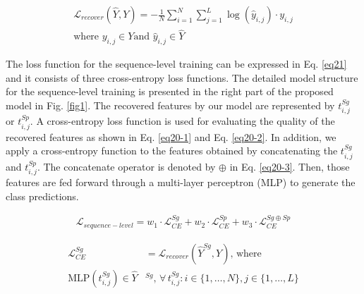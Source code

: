 \vspace{-1pt}
\begin{align}
\label{eq17}
\mathcal{L}_{recover}(\hat{Y}, Y) = -\frac{1}{N} \sum_{i=1}^{N} \sum_{j=1}^{L} \log(\hat{y}_{i, j}) \cdot y_{i,j} \\ \nonumber
\text{where } y_{i, j} \in Y \text{and } \hat{y}_{i, j} \in \hat{Y}
\end{align}
\vspace{-10pt}


The loss function for the sequence-level training can be expressed in Eq. \ref{eq21} and it consists of three cross-entropy loss functions. The detailed model structure for the sequence-level training is presented in the right part of the proposed model in Fig. \ref{fig1}.
%
%
The recovered features by our model are represented by $t^{Sg}_{i,j}$ or $t^{Sp}_{i,j}$.
%
A cross-entropy loss function is used for evaluating the quality of the recovered features as shown in Eq. \ref{eq20-1} and Eq. \ref{eq20-2}. In addition, we apply a cross-entropy function to the features obtained by concatenating the $t^{Sg}_{i,j}$ and $t^{Sp}_{i,j}$. The concatenate operator is denoted by $\oplus$ in Eq. \ref{eq20-3}. 
%
Then, those features are fed forward through a multi-layer perceptron (MLP) to generate the class predictions. 
%

\vspace{-5pt}
\begin{align}
\label{eq21}
\mathcal{L}_{sequence-level} = w_{1} \cdot \mathcal{L}^{Sg}_{CE} + w_{2} \cdot \mathcal{L}^{Sp}_{CE} + w_{3} \cdot  \mathcal{L}^{Sg \oplus Sp}_{CE}
\end{align}

\vspace{-10pt}
\begin{align}
\label{eq20-1}
\mathcal{L}^{Sg}_{CE} &= \mathcal{L}_{recover}(\hat{Y}^{Sg}, Y) \text{, where } 
\\ \nonumber
\text{MLP}(t^{Sg}_{i, j}) \in \hat{Y}&^{Sg}, \,\forall\, t^{Sg}_{i, j} : i \in \{1, \ldots, N\}, j \in \{1, \ldots, L\}
\end{align}

